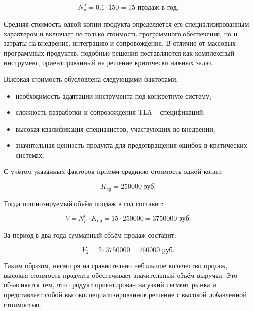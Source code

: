 \begin{equation}
N_p^o = 0.1 \cdot 150 = 15 \text{ продаж в год}.
\end{equation}

Средняя стоимость одной копии продукта определяется его
специализированным характером и включает не только стоимость
программного обеспечения, но и затраты на внедрение, интеграцию и
сопровождение. В отличие от массовых программных продуктов, подобные
решения поставляются как комплексный инструмент, ориентированный на
решение критически важных задач.

Высокая стоимость обусловлена следующими факторами:
\begin{itemize}
\item необходимость адаптации инструмента под конкретную систему;
\item сложность разработки и сопровождения TLA+ спецификаций;
\item высокая квалификация специалистов, участвующих во внедрении;
\item значительная ценность продукта для предотвращения ошибок в
критических системах.
\end{itemize}

С учётом указанных факторов примем среднюю стоимость одной копии:

\begin{equation}
K_{\text{пр}} = 250000 \text{ руб.}
\end{equation}

Тогда прогнозируемый объём продаж в год составит:

\begin{equation}
V = N_p^o \cdot K_{\text{пр}} =
15 \cdot 250000 = 3750000 \text{ руб.}
\end{equation}

За период в два года суммарный объём продаж составит:

\begin{equation}
V_{2} = 2 \cdot 3750000 = 750000 \text{ руб.}
\end{equation}

Таким образом, несмотря на сравнительно небольшое количество продаж,
высокая стоимость продукта обеспечивает значительный объём выручки.
Это объясняется тем, что продукт ориентирован на узкий сегмент рынка и
представляет собой высокоспециализированное решение с высокой
добавленной стоимостью.
